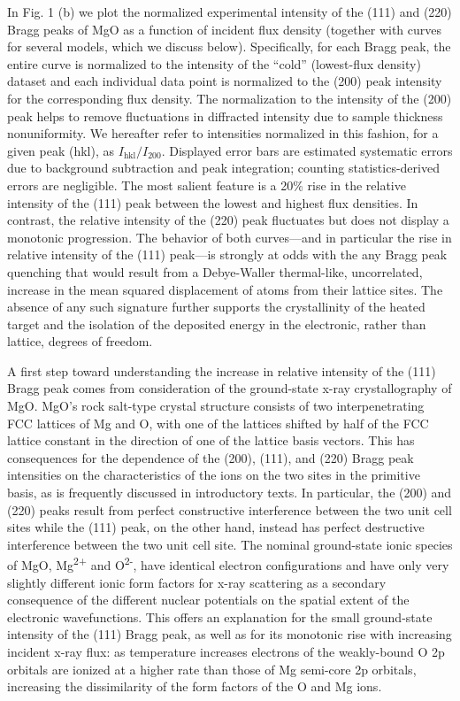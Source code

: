In Fig. 1 (b) we plot the normalized experimental intensity of the (111)
and (220) Bragg peaks of MgO as a function of incident flux density
(together with curves for several models, which we discuss below).
Specifically, for each Bragg peak, the entire curve is normalized to the
intensity of the ``cold'' (lowest-flux density) dataset and each
individual data point is normalized to the (200) peak intensity for the
corresponding flux density. The normalization to the intensity of the
(200) peak helps to remove fluctuations in diffracted intensity due to
sample thickness nonuniformity. We hereafter refer to intensities
normalized in this fashion, for a given peak (hkl), as
\(I_{\text{hkl}}/I_{200}\). Displayed error bars are estimated
systematic errors due to background subtraction and peak integration;
counting statistics-derived errors are negligible. The most salient
feature is a 20\% rise in the relative intensity of the (111) peak
between the lowest and highest flux densities. In contrast, the relative
intensity of the (220) peak fluctuates but does not display a monotonic
progression. The behavior of both curves---and in particular the rise in
relative intensity of the (111) peak---is strongly at odds with the any
Bragg peak quenching that would result from a Debye-Waller thermal-like,
uncorrelated, increase in the mean squared displacement of atoms from
their lattice sites. The absence of any such signature further supports
the crystallinity of the heated target and the isolation of the
deposited energy in the electronic, rather than lattice, degrees of
freedom.

A first step toward understanding the increase in relative intensity of
the (111) Bragg peak comes from consideration of the ground-state x-ray
crystallography of MgO. MgO's rock salt-type crystal structure consists
of two interpenetrating FCC lattices of Mg and O, with one of the
lattices shifted by half of the FCC lattice constant in the direction of
one of the lattice basis vectors. This has consequences for the
dependence of the (200), (111), and (220) Bragg peak intensities on the
characteristics of the ions on the two sites in the primitive basis, as
is frequently discussed in introductory texts. \cite{KITTEL2005INTRODUCTION} In particular,
the (200) and (220) peaks result from perfect constructive interference
between the two unit cell sites while the (111) peak, on the other hand,
instead has perfect destructive interference between the two unit cell
site. The nominal ground-state ionic species of MgO,
Mg\textsuperscript{2+} and O\textsuperscript{2-}, have identical
electron configurations and have only very slightly different ionic form
factors for x-ray scattering as a secondary consequence of the different
nuclear potentials on the spatial extent of the electronic
wavefunctions. This offers an explanation for the small ground-state
intensity of the (111) Bragg peak, as well as for its monotonic rise
with increasing incident x-ray flux: as temperature increases electrons
of the weakly-bound O 2p orbitals are ionized at a higher rate than
those of Mg semi-core 2p orbitals, increasing the dissimilarity of the
form factors of the O and Mg ions.

